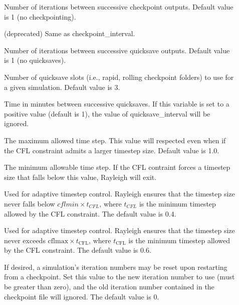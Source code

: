 \documentclass[letterpaper,11pt,english]{sphinxmanual}
\begin{document}
\begin{description}
\item[{}] \leavevmode
\sphinxAtStartPar
Number of iterations between successive checkpoint outputs.  Default value is \sphinxhyphen{}1 (no checkpointing).

\item[{}] \leavevmode
\sphinxAtStartPar
(deprecated) Same as checkpoint\_interval.

\item[{}] \leavevmode
\sphinxAtStartPar
Number of iterations between successive quicksave outputs.  Default value is \sphinxhyphen{}1 (no quicksaves).

\item[{}] \leavevmode
\sphinxAtStartPar
Number of quicksave slots (i.e., rapid, rolling checkpoint folders) to use for a given simulation.  Default value is 3.

\item[{}] \leavevmode
\sphinxAtStartPar
Time in minutes between successive quicksaves.  If this variable is set to a positive value (default is \sphinxhyphen{}1), the value of quicksave\_interval will be ignored.

\item[{}] \leavevmode
\sphinxAtStartPar
The maximum allowed time step.  This value will respected even when if the CFL constraint admits a larger time\sphinxhyphen{}step size.  Default value is 1.0.

\item[{}] \leavevmode
\sphinxAtStartPar
The minimum allowable time step.  If the CFL contraint forces a time\sphinxhyphen{}step size that falls below this value, Rayleigh will exit.

\item[{}] \leavevmode
\sphinxAtStartPar
Used for adaptive timestep control.  Rayleigh ensures that the time\sphinxhyphen{}step size never falls below \(cflmin\times t_{CFL}\), where \(t_{CFL}\) is the minimum timestep allowed by the CFL constraint.  The default value is 0.4.

\item[{}] \leavevmode
\sphinxAtStartPar
Used for adaptive timestep control.  Rayleigh ensures that the time\sphinxhyphen{}step size never exceeds \(\mathrm{cflmax}\times t_\mathrm{CFL}\), where \(t_\mathrm{CFL}\) is the minimum timestep allowed by the CFL constraint. The default value is 0.6.

\item[{}] \leavevmode
\sphinxAtStartPar
If desired, a simulation’s iteration numbers may be reset upon restarting from a checkpoint.  Set this value to the new iteration number to use (must be greater than zero), and the old iteration number contained in the checkpoint file will ignored.  The default value is 0.

\end{description}
\end{document}
